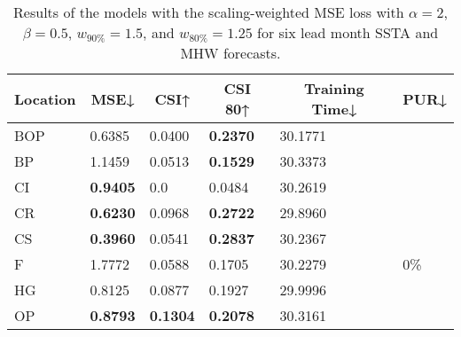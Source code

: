 \documentclass[11pt, a4paper]{article}
\begin{document}
\begin{table}[H]
\centering
\small
\caption{Results of the models with the scaling-weighted MSE loss with $\alpha=2$, $\beta=0.5$, $w_{90\%}=1.5$, and $w_{80\%}=1.25$ for six lead month SSTA and MHW forecasts.}
\begin{tabular}{llllll}
\multicolumn{1}{c}{\textbf{Location}} & \multicolumn{1}{c}{\textbf{MSE↓}} & \multicolumn{1}{c}{\textbf{CSI↑}} & \multicolumn{1}{c}{\textbf{CSI 80↑}} & \multicolumn{1}{c}{\textbf{Training Time↓}} & \multicolumn{1}{c}{\textbf{PUR↓}} \\ \hline
BOP                         & 0.6385                            & 0.0400                            & \textbf{0.2370}                      & 30.1771                                     &                                   \\
BP                        & 1.1459                            & 0.0513                            & \textbf{0.1529}                      & 30.3373                                     &                                   \\
CI                        & \textbf{0.9405}                   & 0.0                               & 0.0484                               & 30.2619                                     &                                   \\
CR                           & \textbf{0.6230}                   & 0.0968                            & \textbf{0.2722}                      & 29.8960                                     &                                   \\
CS                           & \textbf{0.3960}                   & 0.0541                            & \textbf{0.2837}                      & 30.2367                                     &                                   \\
F                             & 1.7772                            & 0.0588                            & 0.1705                               & 30.2279                                     & 0\%                               \\
HG                          & 0.8125                            & 0.0877                            & 0.1927                               & 29.9996                                     &                                   \\
OP                       & \textbf{0.8793}                   & \textbf{0.1304}                   & \textbf{0.2078}                      & 30.3161                                     &                                   \\

\end{tabular}
\end{table}
\end{document}
